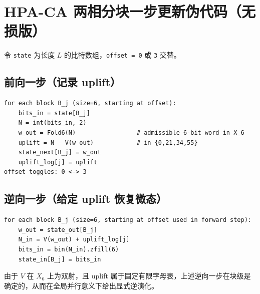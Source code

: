 
\section{HPA-CA 两相分块一步更新伪代码（无损版）}

令 \texttt{state} 为长度 $L$ 的比特数组，\texttt{offset = 0} 或 \texttt{3} 交替。

\subsection{前向一步（记录 uplift）}

\begin{verbatim}
for each block B_j (size=6, starting at offset):
    bits_in = state[B_j]
    N = int(bits_in, 2)
    w_out = Fold6(N)                 # admissible 6-bit word in X_6
    uplift = N - V(w_out)            # in {0,21,34,55}
    state_next[B_j] = w_out
    uplift_log[j] = uplift
offset toggles: 0 <-> 3
\end{verbatim}

\subsection{逆向一步（给定 uplift 恢复微态）}

\begin{verbatim}
for each block B_j (size=6, starting at offset used in forward step):
    w_out = state_out[B_j]
    N_in = V(w_out) + uplift_log[j]
    bits_in = bin(N_in).zfill(6)
    state_in[B_j] = bits_in
\end{verbatim}

由于 $V$ 在 $X_6$ 上为双射，且 uplift 属于固定有限字母表，上述逆向一步在块级是确定的，从而在全局并行意义下给出显式逆演化。

